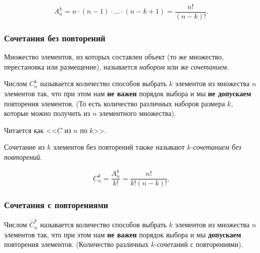\begin{multicols}{2}
      \begin{theorema}{}{}
        \[
          A_n^k = n \cdot (n - 1) \cdot \ldots \cdot (n - k + 1) = \frac{n!}{(n - k)!}.
        \]
      \end{theorema}

      \subsubsection*{Сочетания без повторений}

      \begin{definition}{}{}
        Множество элементов, из которых составлен объект (то же множество, перестановка или размещение), называется \textit{набором} или же \textit{сочетанием}.
      \end{definition}

      \begin{definition}{}{}
        Числом $C_n^k$ называется количество способов выбрать $k$ элементов из множества $n$ элементов так, что при этом нам \textbf{не важен} порядок выбора и мы \textbf{не допускаем} повторения элементов. (То есть количество различных наборов размера $k$, которые можно получить из $n$ элементного множества).
      \end{definition}

      \begin{note}{}{}
        Читается как <<$C$ из $n$ по $k$>>.
      \end{note}

      \begin{note}{}{}
        Сочетание из $k$ элементов без повторений также называют \textit{$k$-сочетанием без повторений}.
      \end{note}

      \begin{theorema}{}{}
        \[
          C_n^k = \frac{A_n^k}{k!} = \frac{n!}{k! (n - k)!}.
        \]
      \end{theorema}

      \subsubsection*{Сочетания с повторениями}

      \begin{definition}{}{}
        Числом $\bar{C}_n^k$ называется количество способов выбрать $k$ элементов из множества $n$ элементов так, что при этом нам \textbf{не важен} порядок выбора и мы \textbf{допускаем} повторения элементов. (Количество различных $k$-сочетаний с повторениями).
      \end{definition}


\end{multicols}

